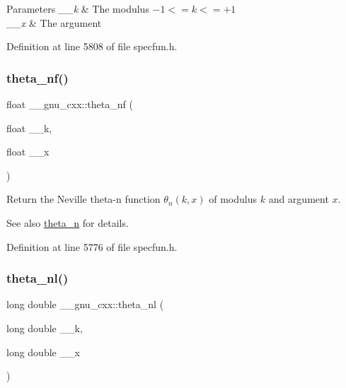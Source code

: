 \begin{DoxyParams}{Parameters}
{\em \+\_\+\+\_\+k} & The modulus $ -1 <= k <= +1 $ \\
\hline
{\em \+\_\+\+\_\+x} & The argument \\
\hline
\end{DoxyParams}


Definition at line 5808 of file specfun.\+h.

\mbox{\label{group__gnu__math__spec__func_ga5298a95e02bd909d55e59c1f2a0b51f8}} 
\subsubsection{\texorpdfstring{theta\+\_\+nf()}{theta\_nf()}}
{\footnotesize\ttfamily float \+\_\+\+\_\+gnu\+\_\+cxx\+::theta\+\_\+nf (\begin{DoxyParamCaption}\item[{float}]{\+\_\+\+\_\+k,  }\item[{float}]{\+\_\+\+\_\+x }\end{DoxyParamCaption})\hspace{0.3cm}{\ttfamily [inline]}}

Return the Neville theta-\/n function $ \theta_n(k,x) $ of modulus $ k $ and argument $ x $.

\begin{DoxySeeAlso}{See also}
\hyperlink{group__gnu__math__spec__func_ga202778bd650e04e9f3729bfca35c32e2}{theta\+\_\+n} for details. 
\end{DoxySeeAlso}


Definition at line 5776 of file specfun.\+h.

\mbox{\label{group__gnu__math__spec__func_ga907f6c147387d55d2dfccbc58d1f1bc5}} 
\subsubsection{\texorpdfstring{theta\+\_\+nl()}{theta\_nl()}}
{\footnotesize\ttfamily long double \+\_\+\+\_\+gnu\+\_\+cxx\+::theta\+\_\+nl (\begin{DoxyParamCaption}\item[{long double}]{\+\_\+\+\_\+k,  }\item[{long double}]{\+\_\+\+\_\+x }\end{DoxyParamCaption})\hspace{0.3cm}{\ttfamily [inline]}}

